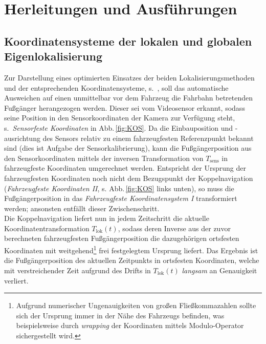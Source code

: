 \chapter{Herleitungen und Ausführungen}
\section{Koordinatensysteme der lokalen und globalen Eigenlokalisierung} \label{app:kos}
Zur Darstellung eines optimierten Einsatzes der beiden Lokalisierungsmethoden und der entsprechenden Koordinatensysteme, s.\ , soll das automatische Ausweichen auf einen unmittelbar vor dem Fahrzeug die Fahrbahn betretenden Fußgänger herangezogen werden. Dieser sei vom Videosensor erkannt, sodass seine Position 
in den Sensorkoordinaten der Kamera zur Verfügung steht, s.\ \emph{Sensorfeste Koordinaten} in Abb.\,\ref{fig:KOS}. Da die Einbauposition und -ausrichtung des Sensors relativ zu einem fahrzeugfesten Referenzpunkt bekannt sind (dies ist Aufgabe der Sensorkalibrierung), kann die Fußgängerposition aus den Sensorkoordinaten mittels der inversen Transformation von $T_\text{sens}$ in fahrzeugfeste Koordinaten umgerechnet werden. Entspricht der Ursprung der fahrzeugfesten Koordinaten noch nicht dem Bezugspunkt der Koppelnavigation (\emph{Fahrzeugfeste Koordinaten II}, s. Abb.\,\ref{fig:KOS} links unten), so muss die Fußgängerposition in das \emph{Fahrzeugfeste Koordinatensystem I} transformiert werden; ansonsten entfällt dieser Zwischenschritt. \\
Die Koppelnavigation liefert nun in jedem Zeitschritt die aktuelle Koordinatentransformation $T_\text{lok}(t)$, sodass deren Inverse aus der zuvor berechneten fahrzeugfesten Fußgängerposition die dazugehörigen ortsfesten Koordinaten mit weitgehend\footnote{Aufgrund numerischer Ungenauigkeiten von großen Fließkommazahlen sollte sich der Ursprung immer in der Nähe des Fahrzeugs befinden, was beispielsweise durch \emph{wrapping} der Koordinaten mittels Modulo-Operator \cite{himmelsbach2008lidar} sichergestellt wird.} frei festgelegtem Ursprung liefert. 
Das Ergebnis ist die Fußgängerposition des aktuellen Zeitpunkts in ortsfesten Koordinaten, welche mit verstreichender Zeit aufgrund des Drifts in $T_\text{lok}(t)$ \emph{langsam} an Genauigkeit verliert. \\
